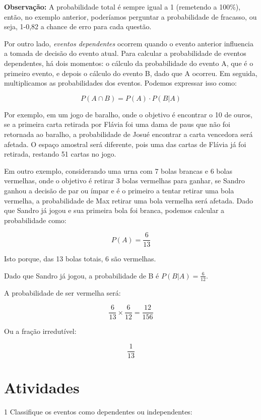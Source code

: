 {\medskip \noindent \textbf{Observação:} A probabilidade total é sempre igual a 1 (remetendo
a 100\%), então, no exemplo anterior, poderíamos perguntar a
probabilidade de fracasso, ou seja, 1-0,82 a chance de erro para cada
questão.

Por outro lado, \textit{eventos dependentes} ocorrem quando o evento anterior
influencia a tomada de decisão do evento atual. Para calcular a probabilidade
de eventos dependentes, há dois momentos: o cálculo da probabilidade do
evento A, que é o primeiro evento, e depois o cálculo do evento B, dado que A
ocorreu. Em seguida, multiplicamos as probabilidades dos eventos.
Podemos expressar isso como:

$$P(A \cap B) = P(A) \cdot P(B|A)$$

Por exemplo, em um jogo de baralho, onde o objetivo é encontrar o 10 de ouros,
se a primeira carta retirada por Flávia foi uma dama de paus que não foi
retornada ao baralho, a probabilidade de Josué encontrar a carta vencedora
será afetada. O espaço amostral será diferente, pois uma das cartas de Flávia
já foi retirada, restando 51 cartas no jogo.

Em outro exemplo, considerando uma urna com 7 bolas brancas e 6 bolas
vermelhas, onde o objetivo é retirar 3 bolas vermelhas para ganhar, se Sandro
ganhou a decisão de par ou ímpar e é o primeiro a tentar retirar uma bola
vermelha, a probabilidade de Max retirar uma bola vermelha será afetada. Dado
que Sandro já jogou e sua primeira bola foi branca, podemos calcular a
probabilidade como:

$$P(A) = \frac{6}{13}$$

Isto porque, das 13 bolas totais, 6 são vermelhas.

Dado que Sandro já jogou, a probabilidade de B é $P(B|A) = \frac{6}{12}$.

A probabilidade de ser vermelha será:

$$\frac{6}{13} \times \frac{6}{12} = \frac{12}{156}$$ 

Ou a fração irredutível:

$$\frac{1}{13}$$
}

\section*{Atividades}

\num{1} Classifique os eventos como dependentes ou independentes:

